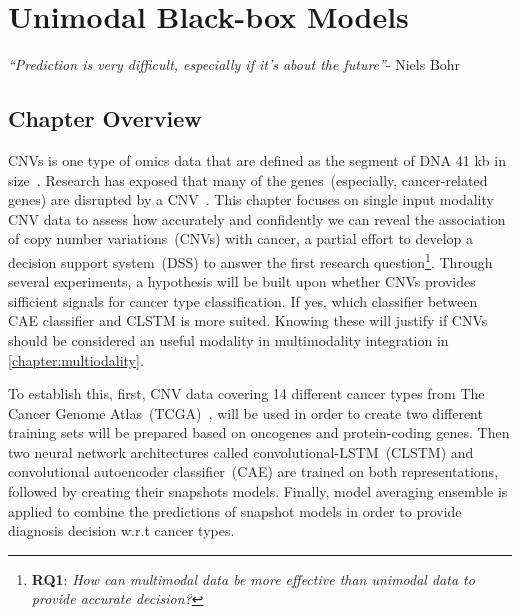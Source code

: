 \chapter{Unimodal Black-box Models}\label{chapter:uni_modality}
\textit{``Prediction is very difficult, especially if it's about the future''}-
Niels Bohr

\section{Chapter Overview} 
CNVs is one type of omics data that are defined as the segment of DNA 41 kb in size~\cite{almal2012implications}. Research has exposed that many of the genes~(especially, cancer-related genes) are disrupted by a CNV~\cite{almal2012implications}. This chapter focuses on single input modality CNV data to assess how accurately and confidently we can reveal the association of copy number variations~(CNVs) with cancer, a partial effort to develop a decision support system~(DSS) to answer the first research question\footnote{\textbf{RQ1}: \textit{How can multimodal data be more effective than unimodal data to provide accurate decision?}}. 
Through several experiments, a hypothesis will be built upon whether CNVs provides sifficient signals for cancer type classification. If yes, which classifier between CAE classifier and CLSTM is more suited. Knowing these will justify if CNVs should be considered an useful modality in multimodality integration in \cref{chapter:multiodality}. 

\hspace*{3.5mm} To establish this, first, CNV data covering 14 different cancer types from The Cancer Genome Atlas~(TCGA)~\cite{tcga}, will be used in order to create two different training sets will be prepared based on oncogenes and protein-coding genes. Then two neural network architectures called convolutional-LSTM~({CLSTM}) and convolutional autoencoder classifier~({CAE}) are trained on both representations, followed by creating their snapshots models. %
Finally, model averaging ensemble is applied to combine the predictions of snapshot models in order to provide diagnosis decision w.r.t cancer types. 

